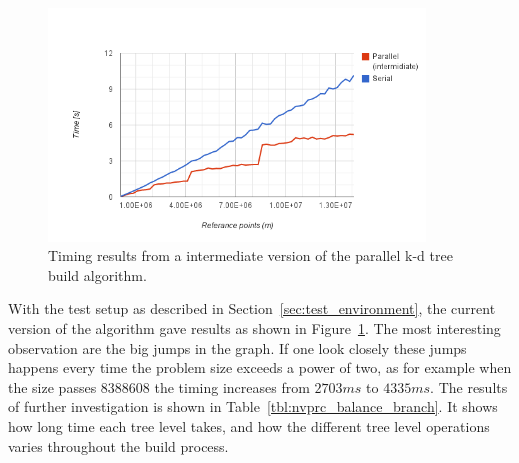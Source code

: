 \begin{figure}[ht!]
\centering
\includegraphics[width=100mm]{../gfx/the_jumps.png}

\caption{Timing results from a intermediate version of the parallel k-d tree build algorithm.}
\label{fig:gpuv1_vs_cpu}
\end{figure}

With the test setup as described in Section~\ref{sec:test_environment}, the current version of the algorithm gave results as shown in Figure~\ref{fig:gpuv1_vs_cpu}. The most interesting observation are the big jumps in the graph. If one look closely these jumps happens every time the problem size exceeds a power of two, as for example when the size passes $8388608$ the timing increases from $2703 ms$ to $4335 ms$. The results of further investigation is shown in Table~\ref{tbl:nvprc_balance_branch}. It shows how long time each tree level takes, and how the different tree level operations varies throughout the build process.

